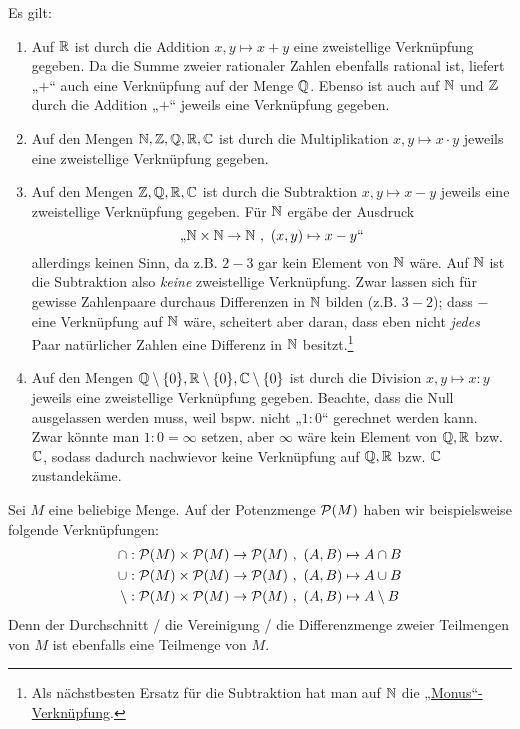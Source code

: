 \begin{bsp}[Grundrechenarten] \label{bsp:verknuepfung}
    Es gilt:
    \begin{enumerate}
        \item Auf $\mathbb R$ ist durch die Addition $x,y\mapsto x+y$ eine zweistellige Verknüpfung gegeben. Da die Summe zweier rationaler Zahlen ebenfalls rational ist, liefert „$+$“ auch eine Verknüpfung auf der Menge $\mathbb Q$. Ebenso ist auch auf $\mathbb N$ und $\mathbb Z$ durch die Addition „$+$“ jeweils eine Verknüpfung gegeben.
        \item Auf den Mengen $\mathbb N,\mathbb Z,\mathbb Q,\mathbb R,\mathbb C$ ist durch die Multiplikation $x,y\mapsto x\cdot y$ jeweils eine zweistellige Verknüpfung gegeben.
        \item Auf den Mengen $\mathbb Z,\mathbb Q,\mathbb R,\mathbb C$ ist durch die Subtraktion $x,y\mapsto x-y$ jeweils eine zweistellige Verknüpfung gegeben. Für $\mathbb N$ ergäbe der Ausdruck
        \[ \text{„$\mathbb N \times \mathbb N \to \mathbb N \ ,\ (x,y) \mapsto x-y$“} \]
        allerdings keinen Sinn, da z.B. $2-3$ gar kein Element von $\mathbb N$ wäre. Auf $\mathbb N$ ist die Subtraktion also \emph{keine} zweistellige Verknüpfung. Zwar lassen sich für gewisse Zahlenpaare durchaus Differenzen in $\mathbb N$ bilden (z.B. $3-2$); dass $-$ eine Verknüpfung auf $\mathbb N$ wäre, scheitert aber daran, dass eben nicht \emph{jedes} Paar natürlicher Zahlen eine Differenz in $\mathbb N$ besitzt.\footnote{Als nächstbesten Ersatz für die Subtraktion hat man auf $\mathbb N$ die \href{https://en.wikipedia.org/wiki/Monus\#Natural_numbers}{„Monus“-Verknüpfung}.}
        \item Auf den Mengen $\mathbb Q\setminus \{0\},\mathbb R\setminus \{0\},\mathbb C\setminus \{0\}$ ist durch die Division $x,y\mapsto x:y$ jeweils eine zweistellige Verknüpfung gegeben. Beachte, dass die Null ausgelassen werden muss, weil bspw. nicht „$1:0$“ gerechnet werden kann. Zwar könnte man $1:0=\infty$ setzen, aber $\infty$ wäre kein Element von $\mathbb Q,\mathbb R$ bzw. $\mathbb C$, sodass dadurch nachwievor keine Verknüpfung auf $\mathbb Q,\mathbb R$ bzw. $\mathbb C$ zustandekäme.
    \end{enumerate}
\end{bsp}


\begin{bsp}
    Sei $M$ eine beliebige Menge. Auf der Potenzmenge $\mathcal P(M)$ haben wir beispielsweise folgende Verknüpfungen:
    \begin{align*}
        \cap : \calP(M)\times \calP(M) \to \calP(M) \ & ,\ (A,B)\mapsto A\cap B \\
        \cup : \calP(M)\times \calP(M) \to \calP(M) \ &,\ (A,B)\mapsto A\cup B \\
        \setminus : \calP(M)\times \calP(M) \to \calP(M) \ &,\ (A,B)\mapsto A\setminus B
    \end{align*}
    Denn der Durchschnitt / die Vereinigung / die Differenzmenge zweier Teilmengen von $M$ ist ebenfalls eine Teilmenge von $M$.
\end{bsp}


